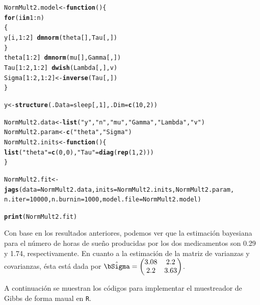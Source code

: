 \documentclass[10pt,openright]{book}\usepackage[]{graphicx}\usepackage[]{color}
\makeatletter
\newcommand{\hlnum}[1]{\textcolor[rgb]{0.686,0.059,0.569}{#1}}%
\newcommand{\hlstr}[1]{\textcolor[rgb]{0.192,0.494,0.8}{#1}}%
\newcommand{\hlopt}[1]{\textcolor[rgb]{0,0,0}{#1}}%
\newcommand{\hlstd}[1]{\textcolor[rgb]{0.345,0.345,0.345}{#1}}%
\newcommand{\hlkwa}[1]{\textcolor[rgb]{0.161,0.373,0.58}{\textbf{#1}}}%
\newcommand{\hlkwb}[1]{\textcolor[rgb]{0.69,0.353,0.396}{#1}}%
\newcommand{\hlkwc}[1]{\textcolor[rgb]{0.333,0.667,0.333}{#1}}%
\newcommand{\hlkwd}[1]{\textcolor[rgb]{0.737,0.353,0.396}{\textbf{#1}}}%
\newenvironment{kframe}{%
 \def\at@end@of@kframe{}%
 \ifinner\ifhmode%
  \def\at@end@of@kframe{\end{minipage}}%
  \begin{minipage}{\columnwidth}%
 \fi\fi%
 \def\FrameCommand##1{\hskip\@totalleftmargin \hskip-\fboxsep
 \colorbox{shadecolor}{##1}\hskip-\fboxsep
     \hskip-\linewidth \hskip-\@totalleftmargin \hskip\columnwidth}%
 \MakeFramed {\advance\hsize-\width
   \@totalleftmargin\z@ \linewidth\hsize
   \@setminipage}}%
 {\par\unskip\endMakeFramed%
 \at@end@of@kframe}
\newenvironment{knitrout}{}{} %
\makeatother
\begin{document}
\begin{Eje}
\begin{knitrout}
\begin{kframe}
\begin{alltt}
\hlstd{NormMult2.model} \hlkwb{<-} \hlkwa{function}\hlstd{()\{}
\hlkwa{for}\hlstd{(i} \hlkwa{in} \hlnum{1} \hlopt{:} \hlstd{n)}
\hlstd{\{}
  \hlstd{y[i,} \hlnum{1}\hlopt{:}\hlnum{2}\hlstd{]} \hlopt{~} \hlkwd{dmnorm}\hlstd{(theta[], Tau[,])}
\hlstd{\}}
\hlstd{theta[}\hlnum{1}\hlopt{:}\hlnum{2}\hlstd{]} \hlopt{~} \hlkwd{dmnorm}\hlstd{(mu[], Gamma[,])}
\hlstd{Tau[}\hlnum{1}\hlopt{:}\hlnum{2}\hlstd{,}\hlnum{1}\hlopt{:}\hlnum{2}\hlstd{]} \hlopt{~} \hlkwd{dwish}\hlstd{(Lambda[,] , v)}
\hlstd{Sigma[}\hlnum{1}\hlopt{:}\hlnum{2}\hlstd{,}\hlnum{1}\hlopt{:}\hlnum{2}\hlstd{]} \hlkwb{<-} \hlkwd{inverse}\hlstd{(Tau[,])}
\hlstd{\}}

\hlstd{y} \hlkwb{<-} \hlkwd{structure}\hlstd{(}\hlkwc{.Data} \hlstd{= sleep[,}\hlnum{1}\hlstd{],} \hlkwc{.Dim}\hlstd{=}\hlkwd{c}\hlstd{(}\hlnum{10}\hlstd{,}\hlnum{2}\hlstd{))}

\hlstd{NormMult2.data} \hlkwb{<-} \hlkwd{list}\hlstd{(}\hlstr{"y"}\hlstd{,}\hlstr{"n"}\hlstd{,}\hlstr{"mu"}\hlstd{,}\hlstr{"Gamma"}\hlstd{,} \hlstr{"Lambda"}\hlstd{,}\hlstr{"v"}\hlstd{)}
\hlstd{NormMult2.param} \hlkwb{<-} \hlkwd{c}\hlstd{(}\hlstr{"theta"}\hlstd{,} \hlstr{"Sigma"}\hlstd{)}
\hlstd{NormMult2.inits} \hlkwb{<-} \hlkwa{function}\hlstd{()\{}
\hlkwd{list}\hlstd{(}\hlstr{"theta"}\hlstd{=}\hlkwd{c}\hlstd{(}\hlnum{0}\hlstd{,}\hlnum{0}\hlstd{),}\hlstr{"Tau"}\hlstd{=}\hlkwd{diag}\hlstd{(}\hlkwd{rep}\hlstd{(}\hlnum{1}\hlstd{,}\hlnum{2}\hlstd{)))}
\hlstd{\}}

\hlstd{NormMult2.fit} \hlkwb{<-} \hlkwd{jags}\hlstd{(}\hlkwc{data}\hlstd{=NormMult2.data,} \hlkwc{inits}\hlstd{=NormMult2.inits, NormMult2.param,}
                      \hlkwc{n.iter}\hlstd{=}\hlnum{10000}\hlstd{,} \hlkwc{n.burnin}\hlstd{=}\hlnum{1000}\hlstd{,} \hlkwc{model.file}\hlstd{=NormMult2.model)}

\hlkwd{print}\hlstd{(NormMult2.fit)}
\end{alltt}
\end{kframe}
\end{knitrout}

Con base en los resultados anteriores, podemos ver que la estimaci\'on bayesiana para el n\'umero de horas de sue\~no producidas por los dos medicamentos son 0.29 y 1.74, respectivamente. En cuanto a la estimaci\'on de la matriz de varianzas y covarianzas, \'esta est\'a dada por $\hat{\bSigma}=\begin{pmatrix}3.08&2.2\\2.2&3.63\end{pmatrix}$.

A continuaci\'on se muestran los c\'odigos para implementar el muestreador de Gibbs de forma maual en \verb'R'.


\end{Eje}
\end{document}
